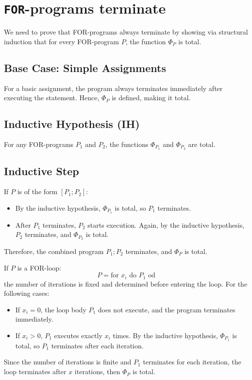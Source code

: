 



\section{\lstinline|FOR|-programs terminate}


We need to prove that FOR-programs always terminate by showing via structural induction that for every FOR-program \( P \), the function \( \Phi_P \) is total.

\subsection*{Base Case: Simple Assignments}
For a basic assignment, the program always terminates immediately after executing the statement. Hence, \( \Phi_P \) is defined, making it total.

\subsection*{Inductive Hypothesis (IH)}
For any FOR-programs \( P_1 \) and \( P_2 \), the functions \( \Phi_{P_1} \) and \( \Phi_{P_2} \) are total. 
\subsection*{Inductive Step}
If \( P \) is of the form \( [P_1; P_2] \):
\begin{itemize}
    \item By the inductive hypothesis, \( \Phi_{P_1} \) is total, so \( P_1 \) terminates.
    \item After \( P_1 \) terminates, \( P_2 \) starts execution. Again, by the inductive hypothesis, \( P_2 \) terminates, and \( \Phi_{P_2} \) is total.
\end{itemize}
Therefore, the combined program \( P_1; P_2 \) terminates, and \( \Phi_P \) is total.

If \( P \) is a FOR-loop:
\[
P = \text{for } x_i \text{ do } P_1 \text{ od}
\]
the number of iterations is fixed and determined before entering the loop. For the following cases:
\begin{itemize}
    \item If \( x_i = 0 \), the loop body \( P_1 \) does not execute, and the program terminates immediately.
    \item If \( x_i > 0 \), \( P_1 \) executes exactly \( x_i \) times. By the inductive hypothesis, \( \Phi_{P_1} \) is total, so \( P_1 \) terminates after each iteration.
\end{itemize}
Since the number of iterations is finite and \( P_1 \) terminates for each iteration, the loop terminates after \( x \) iterations, then \( \Phi_P \) is total.



